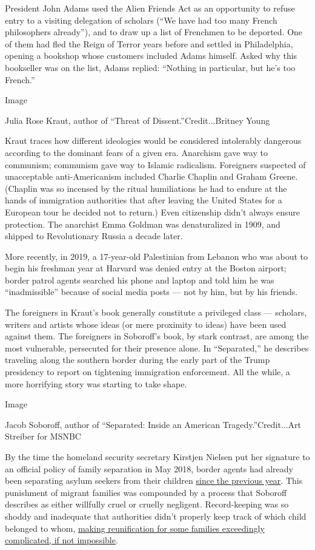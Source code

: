 President John Adams used the Alien Friends Act as an opportunity to
refuse entry to a visiting delegation of scholars (``We have had too
many French philosophers already''), and to draw up a list of Frenchmen
to be deported. One of them had fled the Reign of Terror years before
and settled in Philadelphia, opening a bookshop whose customers included
Adams himself. Asked why this bookseller was on the list, Adams replied:
``Nothing in particular, but he's too French.''

Image

Julia Rose Kraut, author of ``Threat of Dissent.''Credit...Britney Young

Kraut traces how different ideologies would be considered intolerably
dangerous according to the dominant fears of a given era. Anarchism gave
way to communism; communism gave way to Islamic radicalism. Foreigners
suspected of unacceptable anti-Americanism included Charlie Chaplin and
Graham Greene. (Chaplin was so incensed by the ritual humiliations he
had to endure at the hands of immigration authorities that after leaving
the United States for a European tour he decided not to return.) Even
citizenship didn't always ensure protection. The anarchist Emma Goldman
was denaturalized in 1909, and shipped to Revolutionary Russia a decade
later.

More recently, in 2019, a 17-year-old Palestinian from Lebanon who was
about to begin his freshman year at Harvard was denied entry at the
Boston airport; border patrol agents searched his phone and laptop and
told him he was ``inadmissible'' because of social media posts --- not
by him, but by his friends.

The foreigners in Kraut's book generally constitute a privileged class
--- scholars, writers and artists whose ideas (or mere proximity to
ideas) have been used against them. The foreigners in Soboroff's book,
by stark contrast, are among the most vulnerable, persecuted for their
presence alone. In ``Separated,'' he describes traveling along the
southern border during the early part of the Trump presidency to report
on tightening immigration enforcement. All the while, a more horrifying
story was starting to take shape.

Image

Jacob Soboroff, author of ``Separated: Inside an American
Tragedy.''Credit...Art Streiber for MSNBC

By the time the homeland security secretary Kirstjen Nielsen put her
signature to an official policy of family separation in May 2018, border
agents had already been separating asylum seekers from their children
\href{https://www.nytimes3xbfgragh.onion/2018/04/20/us/immigrant-children-separation-ice.html}{since
the previous year}. This punishment of migrant families was compounded
by a process that Soboroff describes as either willfully cruel or
cruelly negligent. Record-keeping was so shoddy and inadequate that
authorities didn't properly keep track of which child belonged to whom,
\href{https://www.newyorker.com/news/news-desk/a-new-report-on-family-separations-shows-the-depths-of-trumps-negligence}{making
reunification for some families exceedingly complicated, if not
impossible}.

